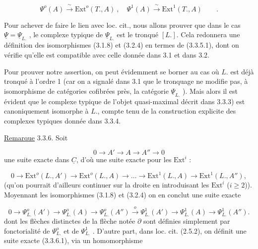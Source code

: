 \begin{equation}\tag{3.3.5.1}
\Psi^o(A) \xrightarrow{\ \sim\ } \mathrm{Ext}^o(T.,A) \ , \quad \Psi^1(A) \xrightarrow{\ \sim\ } \mathrm{Ext}^1(T.,A) \qquad .
\end{equation}


Pour achever de faire le lien avec loc. cit., nous allons prouver que dans le cas $\underline{\Psi} = \underline{\Psi}_{L.}$ , le complexe typique de $\underline{\Psi}_{L.}$ est le tronqué $[L.]$. Cela redonnera une définition des isomorphismes (3.1.8) et (3.2.4) en termes de (3.3.5.1), dont on vérifie qu'elle est compatible avec celle donnée dans 3.1 et dans 3.2.

Pour prouver notre assertion, on peut évidemment se borner au cas où $L.$ est déjà tronqué à l'ordre 1 (car on a signalé dans 3.1 que le tronquage ne modifie pas, à isomorphisme de catégories cofibrées près, la catégorie $\underline{\Psi}_{L.}$ ). Mais alors il est évident que le complexe typique de l'objet quasi-maximal décrit dans 3.3.3) est canoniquement isomorphe à $L.$, compte tenu de la construction explicite des complexes typiques donnée dans 3.3.4.

\underline{Remarque} 3.3.6. Soit

\begin{equation*}
0 \longrightarrow A' \longrightarrow A \longrightarrow A'' \longrightarrow 0
\end{equation*}
une suite exacte dans $\underline{C}$, d'où une suite exacte pour les $\mathrm{Ext}^i$ :

\begin{equation*}
0 \longrightarrow \mathrm{Ext}^o(L.,A') \longrightarrow \mathrm{Ext}^o(L.,A) \rightarrow \ldots \rightarrow \mathrm{Ext}^1(L.,A) \longrightarrow \mathrm{Ext}^1(L.,A''),
\end{equation*}
(qu'on pourrait d'ailleurs continuer sur la droite en introduisant les $\mathrm{Ext}^i$ ($i \geq 2$)). Moyennant les isomorphismes (3.1.8) et (3.2.4) on en conclut une suite exacte

\begin{equation}\tag{3.3.6.1}
0 \longrightarrow \Psi^o_{L.}(A') \longrightarrow \Psi^o_{L.}(A) \longrightarrow \Psi^o_{L.}(A'') \xrightarrow{\ o\ } \Psi^1_{L.}(A') \rightarrow \Psi^1_{L.}(A) \rightarrow \Psi^1_{L.}(A'').
\end{equation}
dont les flèches distinctes de la flèche notée $\partial$ sont définies simplement par fonctorialité de $\Psi^o_{L.}$ et de $\Psi^1_{L.}$ . D'autre part, dans loc. cit. (2.5.2), on définit une suite exacte (3.3.6.1), via un homomorphisme 



